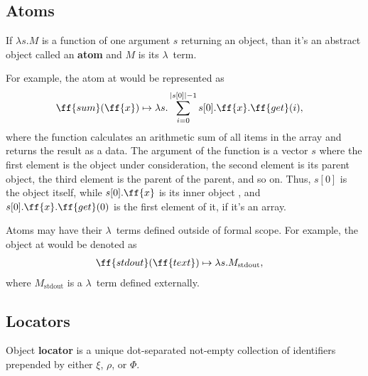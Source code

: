 \subsection{Atoms}

\begin{eodefinition}\label{def:atom}
If $\lambda s.M$ is a function of one argument $s$ returning an object,
than it's an abstract object called an \textbf{atom} and $M$ is its $\lambda$~term.
\end{eodefinition}

For example, the atom at  would be represented as
\begin{equation}
\begin{split}
& \ff{sum}(\ff{x}) \mapsto \lambda s . \sum\limits_{i=0}^{|s[0]| - 1} s[0].\ff{x}.\ff{get}(i),
\end{split}
\end{equation}
where the function calculates an arithmetic sum of all items
in the array  and returns the result as a data. The argument of
the function is a vector $s$ where the first element is the object under
consideration, the second element is its parent object, the third element
is the parent of the parent, and so on. Thus, $s[0]$ is the object
 itself, while $s[0].\ff{x}$ is its inner object ,
and $s[0].\ff{x}.\ff{get}(0)$ is the first element of it, if it's an array.

Atoms may have their $\lambda$~terms defined outside of \phic{} formal scope.
For example, the object at  would be denoted as
\begin{equation}
\begin{split}
& \ff{stdout}(\ff{text}) \mapsto \lambda s.M_\text{stdout},
\end{split}
\end{equation}
where $M_\text{stdout}$ is a $\lambda$~term defined externally.

\subsection{Locators}

\begin{eodefinition}\label{def:locator}
Object \textbf{locator} is a unique dot-separated not-empty
collection of identifiers prepended by either $\xi$, $\rho$, or $\Phi$.
\end{eodefinition}

